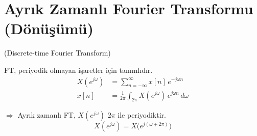 \documentclass[11pt,a4paper]{article}
\begin{document}

\section{Ayrık Zamanlı Fourier Transformu (Dönüşümü)}
(Discrete-time Fourier Transform)

FT, periyodik olmayan işaretler için tanımlıdır.
\begin{align*}
  X(e^{j\omega})&=\sum_{n=-\infty}^{\infty}x[n]\,e^{-j\omega n}\\
  x[n]&=\frac{1}{2\pi}\int_{2\pi}X(e^{j\omega})\,e^{j\omega n}\,d\omega
\end{align*}
\begin{center}
\end{center}
$\Rightarrow$ Ayrık zamanlı FT, $X(e^{j\omega})$ $2\pi$ ile periyodiktir.
\[ X(e^{j\omega})=X\bigl(e^{j(\omega+2\pi)}\bigr) \]
\end{document}
